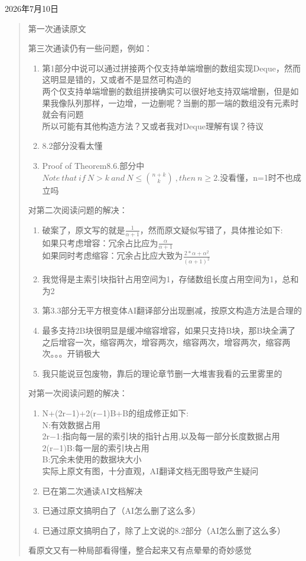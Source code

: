 \documentclass[11pt,a4paper]{article}
\begin{document}
\noindent 2026年7月10日
\begin{quote}
    第一次通读原文

    第三次通读仍有一些问题，例如：
    \begin{enumerate}
        \item 第1部分中说可以通过拼接两个仅支持单端增删的数组实现Deque，然而这明显是错的，又或者不是显然可构造的\\
        两个仅支持单端增删的数组拼接确实可以很好地支持双端增删，但是如果我像队列那样，一边增，一边删呢？当删的那一端的数组没有元素时就会有问题\\
        所以可能有其他构造方法？又或者我对Deque理解有误？待议
        \item 8.2部分没看太懂
        \item Proof of Theorem8.6.部分中 $Note\ that\ if\ N>k\ and\ N\leq \binom{n+k}{k}\ ,then\ n\geq 2.$没看懂，n=1时不也成立吗

    \end{enumerate}
    对第二次阅读问题的解决：
    \begin{enumerate}
        \item 破案了，原文写的就是$\frac{1}{\alpha+1}$，然而原文疑似写错了，具体推论如下:\\
        如果只考虑增容：冗余占比应为$\frac{\alpha}{\alpha+1}$\\
        如果同时考虑缩容：冗余占比应大致为$\frac{2*\alpha+\alpha^2 }{\left( \alpha+1 \right)^2}$\
        \item 我觉得是主索引块指针占用空间为1，存储数组长度占用空间为1，总和为2
        \item 第3.3部分无平方根变体AI翻译部分出现删减，按原文构造方法是合理的
        \item 最多支持2B块很明显是缓冲缩容增容，如果只支持B块，那B块全满了之后增容一次，缩容两次，增容两次，缩容两次，增容两次，缩容两次。。。开销极大
        \item 我只能说豆包废物，靠后的理论章节删一大堆害我看的云里雾里的
    \end{enumerate}
    对第一次阅读问题的解决：
    \begin{enumerate}
        \item N+(2r−1)+2(r−1)B+B的组成修正如下:\\
        N:有效数据占用\\
        2r−1:指向每一层的索引块的指针占用,以及每一部分长度数据占用\\
        2(r−1)B:每一层的索引块占用\\
        B:冗余未使用的数据块大小\\
        实际上原文有图，十分直观，AI翻译文档无图导致产生疑问
        \item 已在第二次通读AI文档解决
        \item 已通过原文搞明白了（AI怎么删了这么多）
        \item 已通过原文搞明白了，除了上文说的8.2部分（AI怎么删了这么多）
    \end{enumerate}
    看原文又有一种局部看得懂，整合起来又有点晕晕的奇妙感觉\\


\end{quote}
\end{document}
